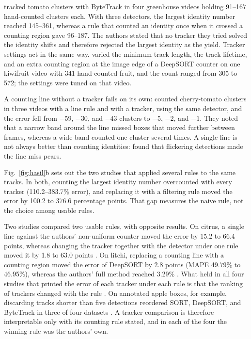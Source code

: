 \citet{rong2023tomato} tracked tomato clusters with ByteTrack in four greenhouse videos holding 91--167 hand-counted clusters each. With three detectors, the largest identity number reached 145--361, whereas a rule that counted an identity once when it crossed a counting region gave 96--187. The authors stated that no tracker they tried solved the identity shifts and therefore rejected the largest identity as the yield. Tracker settings act in the same way. \citet{ripa2022orchard} varied the minimum track length, the track lifetime, and an extra counting region at the image edge of a DeepSORT counter on one kiwifruit video with 341 hand-counted fruit, and the count ranged from 305 to 572; the settings were tuned on that video.

A counting line without a tracker fails on its own: \citet{tenorio2021automatic} counted cherry-tomato clusters in three videos with a line rule and with a tracker, using the same detector, and the error fell from $-59$, $-30$, and $-43$ clusters to $-5$, $-2$, and $-1$. They noted that a narrow band around the line missed boxes that moved further between frames, whereas a wide band counted one cluster several times. A single line is not always better than counting identities: \citet{parico2021real} found that flickering detections made the line miss pears.

Fig.~\ref{fig:hasil}b sets out the two studies that applied several rules to the same tracks. In both, counting the largest identity number overcounted with every tracker (110.2--383.7\% error), and replacing it with a filtering rule moved the error by 100.2 to 376.6 percentage points. That gap measures the naive rule, not the choice among usable rules.

Two studies compared two usable rules, with opposite results. On citrus, a single line against the authors' non-uniform counter moved the error by 15.2 to 66.4 points, whereas changing the tracker together with the detector under one rule moved it by 1.8 to 63.0 points \citep{zheng2023efficient}. On litchi, replacing a counting line with a counting region moved the error of DeepSORT by 2.8 points (MAPE 49.79\% to 46.95\%), whereas the authors' full method reached 3.29\% \citep{lu2025iot}. What held in all four studies that printed the error of each tracker under each rule is that the ranking of trackers changed with the rule \citep{zhou2024advancing,zhang2025row,zheng2023efficient,matos2024tracking}. On annotated apple boxes, for example, discarding tracks shorter than five detections reordered SORT, DeepSORT, and ByteTrack in three of four datasets \citep{matos2024tracking}. A tracker comparison is therefore interpretable only with its counting rule stated, and in each of the four the winning rule was the authors' own.

